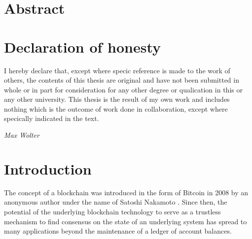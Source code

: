 \documentclass[12pt,a4paper]{article}
\begin{document}
\newpage

\vspace{4cm}

\section*{Abstract}

\begin{abstract}
  This paper explores the feasability of a modern risk management approach in the context of blockchain consensus networks. A framework is created on the basis of a theoretical, technical and social analysis of vulnerabilities on \glspl{blockchain}. The result is then applied to a real-world blockchain project with a method similar to popular risk management approaches.
\end{abstract}

\newpage

\section*{Declaration of honesty}

I hereby declare that, except where specic reference is made to the work of others, the contents of this thesis are original and have not been submitted in whole or in part for consideration for any other degree or qualication in this or any other university. This thesis is the result of my own work and includes nothing which is the outcome of work done in collaboration, except where specically indicated in the text.\\
\vspace{4cm}
\begin{displayquote}
  \textit{Max Wolter}
\end{displayquote}

\newpage

\onehalfspacing
\tableofcontents
\singlespacing
\newpage

\section{Introduction}

The concept of a \gls{blockchain} was introduced in the form of Bitcoin in 2008 by an anonymous author under the name of Satoshi Nakamoto \cite{bitcoin}. Since then, the potential of the underlying blockchain technology to serve as a trustless mechanism to find consensus on the state of an underlying system has spread to many applications beyond the maintenance of a ledger of account balances.\\
\end{document}
